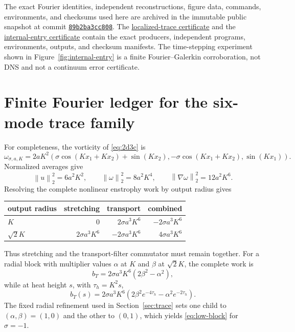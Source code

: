 \documentclass[11pt]{article}
\theoremstyle{definition}
\newcommand{\norm}[1]{\left\lVert #1\right\rVert}
\begin{document}
The exact Fourier identities, independent reconstructions, figure data,
commands, environments, and checksums used here are archived in the
immutable public snapshot at commit
\href{https://github.com/Kasifa/Kasifa.github.io/tree/89b2ba3cc808973a25bc605087e8f6c50ca94df0}
{\texttt{89b2ba3cc808}}.  The
\href{https://github.com/Kasifa/Kasifa.github.io/tree/89b2ba3cc808973a25bc605087e8f6c50ca94df0/research/certificates/r071f}
{localized-trace certificate} and the
\href{https://github.com/Kasifa/Kasifa.github.io/tree/89b2ba3cc808973a25bc605087e8f6c50ca94df0/research/certificates/r071t}
{internal-entry certificate} contain the exact producers, independent
programs, environments, outputs, and checksum manifests.
The time-stepping experiment shown in
Figure~\ref{fig:internal-entry} is a finite Fourier--Galerkin corroboration,
not DNS and not a continuum error certificate.

\appendix
\section{Finite Fourier ledger for the six-mode trace family}

For completeness, the vorticity of \eqref{eq:2d3c} is
\[
 \omega_{\sigma,a,K}=2aK^2
 \left(
 \sigma\cos(Kx_1+Kx_2)+\sin(Kx_2),
 -\sigma\cos(Kx_1+Kx_2),
 \sin(Kx_1)
 \right).
\]
Normalized averages give
\begin{equation}\label{eq:appendix-norms}
 \norm{u}_2^2=6a^2K^2,
 \qquad
 \norm\omega_2^2=8a^2K^4,
 \qquad
 \norm{\nabla\omega}_2^2=12a^2K^6.
\end{equation}
Resolving the complete nonlinear enstrophy work by output radius gives
\begin{center}
\begin{tabular}{@{}lrrr@{}}
\toprule
output radius & stretching & transport & combined \\
\midrule
\(K\) & \(0\) & \(2\sigma a^3K^6\) & \(-2\sigma a^3K^6\) \\
\(\sqrt2K\) & \(2\sigma a^3K^6\) & \(-2\sigma a^3K^6\) & \(4\sigma a^3K^6\) \\
\bottomrule
\end{tabular}
\end{center}
Thus stretching and the transport-filter commutator must remain together.
For a radial block with multiplier values \(\alpha\) at \(K\) and
\(\beta\) at \(\sqrt2K\), the complete work is
\[
 b_T=2\sigma a^3K^6(2\beta^2-\alpha^2),
\]
while at heat height \(s\), with \(\tau_h=K^2s\),
\[
 b_T(s)=2\sigma a^3K^6
 \left(2\beta^2e^{-4\tau_h}-\alpha^2e^{-2\tau_h}\right).
\]
The fixed radial refinement used in Section~\ref{sec:trace} sets one child
to \((\alpha,\beta)=(1,0)\) and the other to \((0,1)\), which yields
\eqref{eq:low-block} for \(\sigma=-1\).



\end{document}

